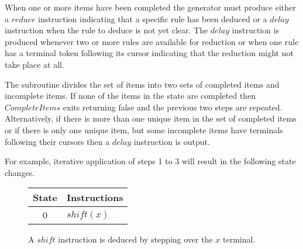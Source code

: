 \documentclass[envcountsame,runningheads]{llncs}
\begin{document}
\begin{enumerate}
When one or more items have been completed the generator must produce either a $reduce$ instruction indicating that a specific rule has been deduced or a $delay$ instruction when the rule to deduce is not yet clear.
The $delay$ instruction is produced whenever two or more rules are available for reduction or when one rule has a terminal token following its cursor indicating that the reduction might not take place at all.

The subroutine divides the set of items into two sets of completed items and incomplete items.
If none of the items in the state are completed then $CompleteItems$ exits returning false and the previous two steps are repeated.
Alternatively, if there is more than one unique item in the set of completed items or if there is only one unique item, but some incomplete items have terminals following their cursors then a $delay$ instruction is output.
\end{enumerate}

For example, iterative application of steps 1 to 3 will result in the following state changes.

\begin{figure}[!ht]
\centering
{}

\vspace{.5\baselineskip}
\small{\begin{tabular}{|c|l|}
  \hline
  \textbf{State} & \textbf{Instructions} \\
  \hline
  0 & $shift(x)$ \\ 
  \hline
\end{tabular}}
\caption{A $shi\!ft$ instruction is deduced by stepping over the $x$ terminal.}
\end{figure}
\end{document}
